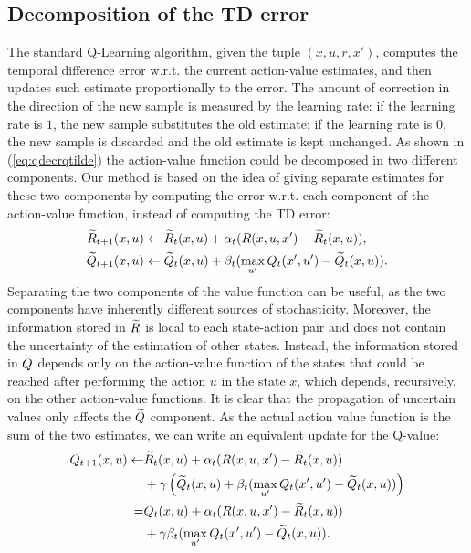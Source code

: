 \documentclass[conference]{IEEEtran}
\begin{document}
\subsection{Decomposition of the TD error}
The standard Q-Learning algorithm, given the tuple $(x,u,r,x')$, computes the temporal difference error w.r.t. the current action-value estimates, and then updates such estimate proportionally to the error. The amount of correction in the direction of the new sample is measured by the learning rate: if the learning rate is $1$, the new sample substitutes the old estimate; if the learning rate is $0$, the new sample is discarded and the old estimate is kept unchanged. 
As shown in (\ref{eq:qdecrqtilde}) the action-value function could be decomposed in two different components. Our method is based on the idea of giving separate estimates for these two components by computing the error w.r.t. each component of the action-value function, instead of computing the TD error:
\begin{align}
\Rtilde_{t+1}(x,u) & \leftarrow\Rtilde_t(x,u)+\alpha_t(R(x,u,x')-\Rtilde_t(x,u)), \label{eq:rtilupdedate}\\
\Qtilde_{t+1}(x,u) & \leftarrow\Qtilde_t(x,u)+\beta_t(\max_{u'}Q_t(x',u')-\Qtilde_t(x,u)).
\label{eq:qtildeupdate}
\end{align}
Separating the two components of the value function can be useful, as the two components have inherently different sources of stochasticity. Moreover, the information stored in $\widetilde{R}$ is local to each state-action pair and does not contain the uncertainty of the estimation of other states. Instead, the information stored in $\widetilde{Q}$ depends only on the action-value function of the states that could be reached after performing the action $u$ in the state $x$, which depends, recursively, on the other action-value functions. It is clear that the propagation of uncertain values only affects the $\widetilde{Q}$ component.
As the actual action value function is the sum of the two estimates, we can write an equivalent update for the Q-value:
\begin{align}
Q_{t+1}(x,u)\leftarrow&\Rtilde_t(x,u)+\alpha_t(R(x,u,x')-\Rtilde_t(x,u)) \nonumber\\
  & +\gamma\left(\Qtilde_t(x,u)+\beta_t(\max_{u'}Q_t(x',u')-\Qtilde_t(x,u))\right) \nonumber\\
= & Q_t(x,u)+\alpha_t(R(x,u,x')-\Rtilde_t(x,u)) \nonumber\\
  & +\gamma\beta_t(\max_{u'}Q_t(x',u')-\Qtilde_t(x,u)).
 \label{eq:cumulativeupdate}
\end{align}
\end{document}
